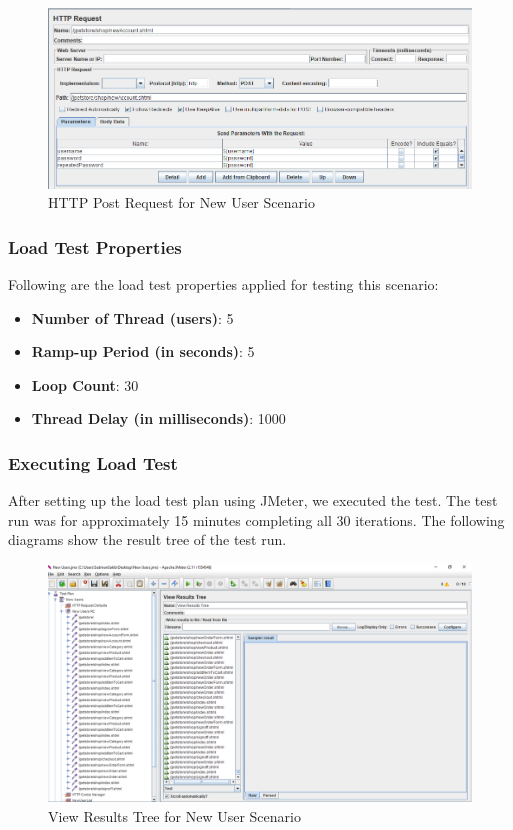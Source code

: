 \documentclass[fontsize=12pt,paper=letter,twoside]{scrartcl}
\begin{document}
\begin{figure}[!htb]
\begin{center}
\includegraphics[width=.7\textwidth]{../../load-test/test-plans/new-user/post-request.png}
\end{center}
\caption{HTTP Post Request for New User Scenario}
\label{fig:ruser:csv}
\end{figure}

\clearpage
\subsubsection{Load Test Properties}
Following are the load test properties applied for testing this scenario:
\begin{itemize}
\item \textbf{Number of Thread (users)}: 5
\item \textbf{Ramp-up Period (in seconds)}: 5
\item \textbf{Loop Count}: 30
\item \textbf{Thread Delay (in milliseconds)}: 1000
\end{itemize}

\subsubsection{Executing Load Test}
After setting up the load test plan using JMeter, we executed the test. The test run was for approximately 15 minutes completing all 30 iterations. The following diagrams show the result tree of the test run.

\begin{figure}[!htb]
\begin{center}
\includegraphics[width=.9\textwidth]{../../load-test/test-plans/new-user/result-tree.png}
\end{center}
\caption{View Results Tree for New User Scenario}
\label{fig:nuser:view_result_tree}
\end{figure}
\end{document}
